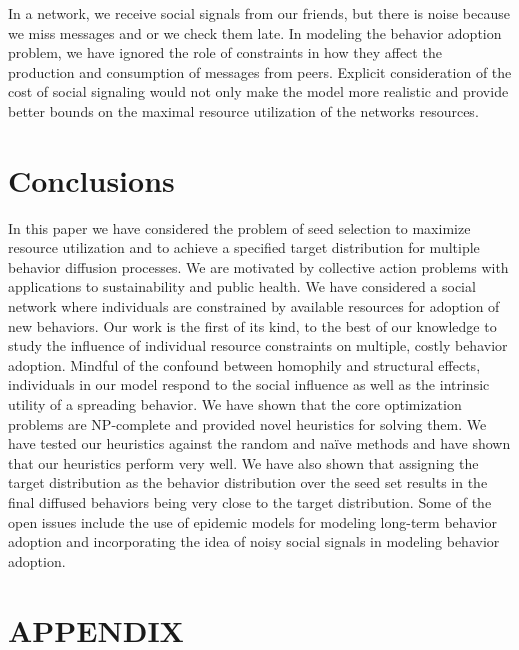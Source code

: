 \documentclass[letterpaper]{article}
\theoremstyle{plain} 		\newtheorem{thm}{Theorem}[section]
\theoremstyle{definition} 	\newtheorem{defn}[thm]{Definition}
\theoremstyle{remark}		\newtheorem{rem}{Remark}
\begin{document}
In a network, we receive social signals from our friends, but there is noise because we miss messages and or we check them late. In modeling the behavior adoption problem, we have ignored the role of constraints in how they affect the production and consumption of messages from peers. Explicit consideration of the cost of social signaling would not only make the model more realistic and provide better bounds on the maximal resource utilization of the networks resources.

\section{Conclusions}\label{sec:conclusion}
In this paper we have considered the problem of seed selection to maximize resource utilization and to achieve a specified target distribution for multiple behavior diffusion processes.  We are motivated by collective action problems with applications to sustainability and public health. We have considered a social network where individuals are constrained by available resources for adoption of new behaviors. Our work is the first of its kind, to the best of our knowledge to study the influence of individual resource constraints on multiple, costly behavior adoption. Mindful of the confound between homophily and structural effects, individuals in our model respond to the social influence as well as the intrinsic utility of a spreading behavior. We have shown that the core optimization problems are NP-complete and provided novel heuristics for solving them. We have tested our heuristics against the random and na\"ive methods and have shown that our heuristics perform very well. We have also shown that assigning the target distribution as the behavior distribution over the seed set results in the final diffused behaviors being very close to the target distribution. Some of the open issues include the use of epidemic models for modeling long-term behavior adoption and incorporating the idea of noisy social signals in modeling behavior adoption.

\appendix
\section*{APPENDIX} \label{sec:appendix}
\setcounter{section}{1}
\end{document}
